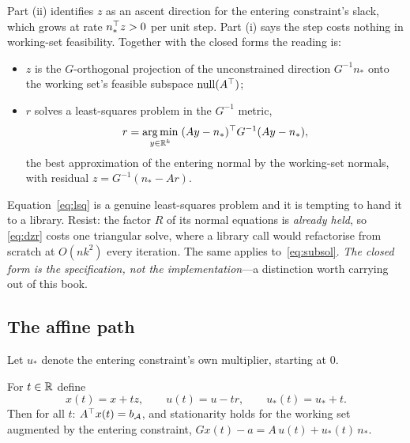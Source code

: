 Part (ii) identifies $z$ as an ascent direction for the entering constraint's
slack, which grows at rate $n_*^{\top} z > 0$ per unit step. Part (i) says the step
costs nothing in working-set feasibility. Together with the closed forms the
reading is:
\begin{itemize}
  \item $z$ is the $G$-orthogonal projection of the unconstrained direction
        $G^{-1}n_*$ onto the working set's feasible subspace $\operatorname{null}(A^{\top})$;
  \item $r$ solves a least-squares problem in the $G^{-1}$ metric,
        \begin{equation}
          r = \operatorname*{arg\,min}_{y \in \mathbb{R}^k} \; (Ay - n_*)^{\top} G^{-1} (A y - n_*),
          \label{eq:lsq}
        \end{equation}
        the best approximation of the entering normal by the working-set normals,
        with residual $z = G^{-1}(n_* - Ar)$.
\end{itemize}

\begin{remark}
Equation~\eqref{eq:lsq} is a genuine least-squares problem and it is tempting to
hand it to a library. Resist: the factor $R$ of its normal equations is
\emph{already held}, so \eqref{eq:dzr} costs one triangular solve, where a library
call would refactorise from scratch at $O(nk^2)$ every iteration. The same applies
to~\eqref{eq:subsol}. \emph{The closed form is the specification, not the
implementation}---a distinction worth carrying out of this book.
\end{remark}

\subsection{The affine path}

Let $u_*$ denote the entering constraint's own multiplier, starting at $0$.

\begin{proposition}
\label{prop:path}
For $t \in \mathbb{R}$ define
\begin{equation}
  x(t) = x + t z, \qquad u(t) = u - t r, \qquad u_*(t) = u_* + t .
  \label{eq:path}
\end{equation}
Then for all $t$: $A^{\top} x(t) = b_{\mathcal{A}}$, and stationarity holds for the working set
augmented by the entering constraint,
$G x(t) - a = A\, u(t) + u_*(t)\, n_*$.
\end{proposition}

